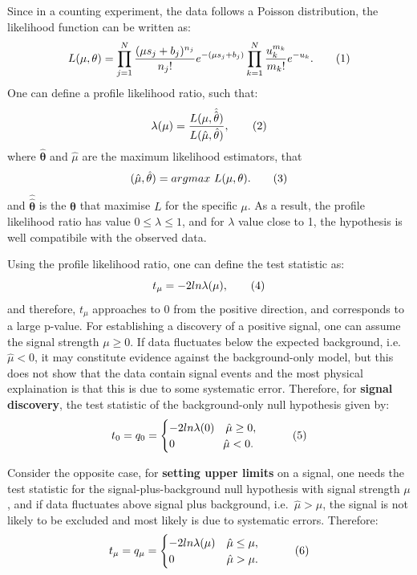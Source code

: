 Since in a counting experiment, the data follows a Poisson distribution, 
the likelihood function can be written as:
\[
L(\mu, \mathbf{\theta}) = \prod^N_{j=1}    \frac{(\mu s_j + b_j )^{n_j}}{n_j !} e^{-(\mu s_j + b_j)}
\prod^N_{k=1} \frac{u_k^{m_k}}{m_k!}e^{-u_k} .
\addtag \]
One can define a profile likelihood ratio, such that:
\[
\lambda (\mu)  = \frac{L(\mu, \hat{\hat{\mathbf{\theta}}})}{L(\hat{\mu}, \hat{\mathbf{\theta}})},
\addtag \]
where $\hat{\mathbf{\theta}}$ and $\hat{\mu}$ are the maximum likelihood estimators,
that
\[
( \hat{\mathbf{\mu}}, \hat{\mathbf{\theta}} ) = argmax\ L(\mu, \theta).
\addtag \]
and $\hat{\hat{\mathbf{\theta}}}$ is the $\mathbf{\theta}$ that maximise $L$
for the specific $\mu$. 
As a result, the profile likelihood ratio has value $0 \le \lambda \le 1$, and for $\lambda$ value
close to 1, the hypothesis is well compatibile with the observed data. 

Using the profile likelihood ratio, one can define the test statistic as:
\[
t_\mu = -2 ln \lambda(\mu) ,
\addtag \]
and therefore, $t_\mu$ approaches to 0 from the positive direction, and corresponds to
a large p-value.  
For establishing a discovery of a positive signal, one can assume the signal 
strength $\mu \ge 0$. If data fluctuates below the expected  background, 
i.e.~$\hat{\mu} < 0$, it may constitute evidence against the background-only model, 
but this does not show that the data contain signal events
and the most physical explaination is that this is due to
some systematic error. Therefore, for \textbf{signal discovery},
the test statistic of the background-only null hypothesis  given by:
\[
  t_0 =q_0 =   \begin{cases}    
        -2 ln \lambda(0) \quad \hat{\mu} \ge 0, \\
        0  \qquad \qquad             \     \hat{\mu} < 0.
    \end{cases} 
\addtag \]

Consider the opposite case, for \textbf{setting upper limits} on a signal, one needs the test
statistic for the signal-plus-background null hypothesis with signal strength $\mu$, 
and if data fluctuates above signal plus background, i.e.~$\hat{\mu} > \mu$, 
the signal is not likely to be excluded and most likely is due to systematic errors. 
Therefore:
\[
  t_\mu =q_\mu =   \begin{cases}
    -2 ln \lambda(\mu) \quad \hat{\mu} \le \mu, \\
    0  \qquad \qquad  \   \             \hat{\mu} > \mu.
    \end{cases} 
\addtag \]



